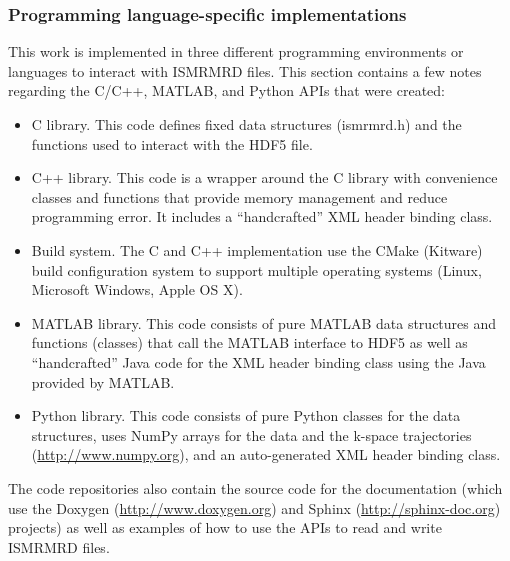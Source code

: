\documentclass[12pt]{article}
\begin{document}
\subsubsection*{Programming language-specific implementations}
This work is implemented in three different programming environments or languages to interact with ISMRMRD files. This section contains a few notes regarding the C/C++, MATLAB, and Python APIs that were created:
\begin{itemize}
\item{C library.}  This code defines fixed data structures (ismrmrd.h) and the functions used to interact with the HDF5 file.
\item{C++ library.} This code is a wrapper around the C library with convenience classes and functions that provide memory management and reduce programming error.  It includes a ``handcrafted'' XML header binding class.  
\item{Build system.} The C and C++ implementation use the CMake (Kitware) build configuration system to support multiple operating systems (Linux, Microsoft Windows, Apple OS X).
\item{MATLAB library.} This code consists of pure MATLAB data structures and functions (classes) that call the MATLAB interface to HDF5 as well as ``handcrafted'' Java code for the XML header binding class using the Java provided by MATLAB.
\item{Python library.} This code consists of pure Python classes for the data structures, uses NumPy arrays for the data and the k-space trajectories (\url{http://www.numpy.org}), and an auto-generated XML header binding class.
\end{itemize}

The code repositories also contain the source code for the documentation (which use the Doxygen (\url{http://www.doxygen.org}) and Sphinx (\url{http://sphinx-doc.org}) projects) as well as examples of how to use the APIs to read and write ISMRMRD files.
\end{document}
